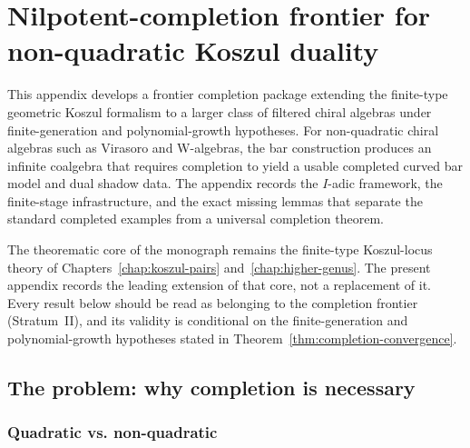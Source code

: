 
\providecommand{\bk}{\mathbb{k}}
\chapter{Nilpotent-completion frontier for non-quadratic Koszul duality}
\label{app:nilpotent-completion}


This appendix develops a frontier completion package extending the
finite-type geometric Koszul formalism to a larger class of filtered
chiral algebras under finite-generation and polynomial-growth
hypotheses.  For non-quadratic chiral algebras such as Virasoro and
W-algebras, the bar construction produces an infinite coalgebra that
requires completion to yield a usable completed curved bar model and
dual shadow data.  The appendix records the $I$-adic framework, the
finite-stage infrastructure, and the exact missing lemmas that separate
the standard completed examples from a universal completion theorem.

\begin{remark}
\label{rem:nilpotent-completion-dependency}
The theorematic core of the monograph remains the finite-type
Koszul-locus theory of Chapters~\ref{chap:koszul-pairs}
and~\ref{chap:higher-genus}.  The present appendix records the leading
extension of that core, not a replacement of it.  Every result below
should be read as belonging to the completion frontier (Stratum~II),
and its validity is conditional on the finite-generation and
polynomial-growth hypotheses stated in
Theorem~\ref{thm:completion-convergence}.
\end{remark}

\section{The problem: why completion is necessary}

\subsection{Quadratic vs. non-quadratic}

